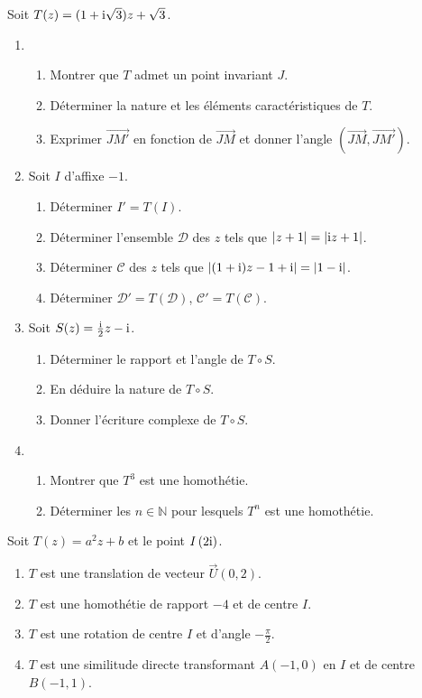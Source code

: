 \begin{exercice}
Soit $T(z) = (1+\text{i}\sqrt{3})z + \sqrt{3}$.
\begin{enumerate}
  \item
    \begin{enumerate}
      \item Montrer que $T$ admet un point invariant $J$.
      \item D\'eterminer la nature et les \'el\'ements caract\'eristiques de $T$.
      \item Exprimer $\overrightarrow{JM'}$ en fonction de $\overrightarrow{JM}$ et donner l'angle $(\overrightarrow{JM}, \overrightarrow{JM'})$.
    \end{enumerate}
  \item Soit $I$ d'affixe $-1$.
    \begin{enumerate}
      \item D\'eterminer $I' = T(I)$.
      \item D\'eterminer l'ensemble $\mathcal{D}$ des $z$ tels que $|z + 1| = |\text{i} z + 1|$.
      \item D\'eterminer $\mathcal{C}$ des $z$ tels que $|(1+\text{i})z -1+\text{i}| = |1 - \text{i}|$.
      \item D\'eterminer $\mathcal{D}' = T(\mathcal{D})$, $\mathcal{C}' = T(\mathcal{C})$.
    \end{enumerate}
  \item Soit $S(z) = \frac{\text{i}}{2}z - \text{i}$.
    \begin{enumerate}
      \item D\'eterminer le rapport et l'angle de $T \circ S$.
      \item En d\'eduire la nature de $T \circ S$.
      \item Donner l'\'ecriture complexe de $T \circ S$.
    \end{enumerate}
  \item
    \begin{enumerate}
      \item Montrer que $T^3$ est une homoth\'etie.
      \item D\'eterminer les $n \in \mathbb{N}$ pour lesquels $T^n$ est une homoth\'etie.
    \end{enumerate}
\end{enumerate}
\end{exercice}

\begin{exercice}
Soit $T(z) = a^2z + b$ et le point $I \left( 2\text{i}\right)$.
\begin{enumerate}
  \item $T$ est une translation de vecteur $\vec{U}(0, 2)$.
  \item $T$ est une homoth\'etie de rapport $-4$ et de centre $I$.
  \item $T$ est une rotation de centre $I$ et d'angle $-\frac{\pi}{2}$.
  \item $T$ est une similitude directe transformant $A(-1, 0)$ en $I$ et de centre $B(-1,1)$.
\end{enumerate}
\end{exercice}


